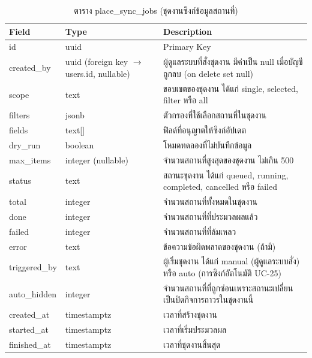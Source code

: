 \begin{table}[H]
\centering
\caption{ตาราง place\_sync\_jobs (ชุดงานซิงก์ข้อมูลสถานที่)}
\label{tab:db_sync}
\begin{tabular}{|p{3.6cm}|p{2.6cm}|p{6.8cm}|}
\hline
\textbf{Field} & \textbf{Type} & \textbf{Description} \\
\hline
id & uuid & Primary Key \\ \hline
created\_by & uuid (foreign key $\to$ users.id, nullable) & ผู้ดูแลระบบที่สั่งชุดงาน มีค่าเป็น null เมื่อบัญชีถูกลบ (on delete set null) \\ \hline
scope & text & ขอบเขตของชุดงาน ได้แก่ single, selected, filter หรือ all \\ \hline
filters & jsonb & ตัวกรองที่ใช้เลือกสถานที่ในชุดงาน \\ \hline
fields & text[] & ฟิลด์ที่อนุญาตให้ซิงก์อัปเดต \\ \hline
dry\_run & boolean & โหมดทดลองที่ไม่บันทึกข้อมูล \\ \hline
max\_items & integer (nullable) & จำนวนสถานที่สูงสุดของชุดงาน ไม่เกิน 500 \\ \hline
status & text & สถานะชุดงาน ได้แก่ queued, running, completed, cancelled หรือ failed \\ \hline
total & integer & จำนวนสถานที่ทั้งหมดในชุดงาน \\ \hline
done & integer & จำนวนสถานที่ที่ประมวลผลแล้ว \\ \hline
failed & integer & จำนวนสถานที่ที่ล้มเหลว \\ \hline
error & text & ข้อความข้อผิดพลาดของชุดงาน (ถ้ามี) \\ \hline
triggered\_by & text & ผู้เริ่มชุดงาน ได้แก่ manual (ผู้ดูแลระบบสั่ง) หรือ auto (การซิงก์อัตโนมัติ UC-25) \\ \hline
auto\_hidden & integer & จำนวนสถานที่ที่ถูกซ่อนเพราะสถานะเปลี่ยนเป็นปิดกิจการถาวรในชุดงานนี้ \\ \hline
created\_at & timestamptz & เวลาที่สร้างชุดงาน \\ \hline
started\_at & timestamptz & เวลาที่เริ่มประมวลผล \\ \hline
finished\_at & timestamptz & เวลาที่ชุดงานสิ้นสุด \\
\hline
\end{tabular}
\end{table}

